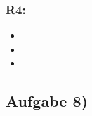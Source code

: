 \documentclass{swp1}
\begin{document}
\subsubsection*{R4:}
\begin{itemize}
\item 
\item
\item
\end{itemize}

\subsection*{Aufgabe 8)}
\end{document}
